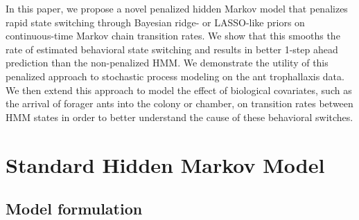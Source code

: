 \documentclass[smallextended]{svjour3}       %
\begin{document}
In this paper, we propose a novel penalized hidden Markov model that penalizes rapid state switching through  Bayesian ridge- or LASSO-like priors on continuous-time Markov chain transition rates. We show that this smooths the rate of estimated behavioral state switching and results in better 1-step ahead prediction than the non-penalized HMM. We demonstrate the utility of this penalized approach to stochastic process modeling on the ant trophallaxis data. We then extend this approach to model the effect of biological covariates, such as the arrival of forager ants into the colony or chamber, on transition rates between HMM states in order to better understand the cause of these behavioral switches. 

\section{Standard Hidden Markov Model}
\subsection{Model formulation}
\label{s:standard}
\end{document}
